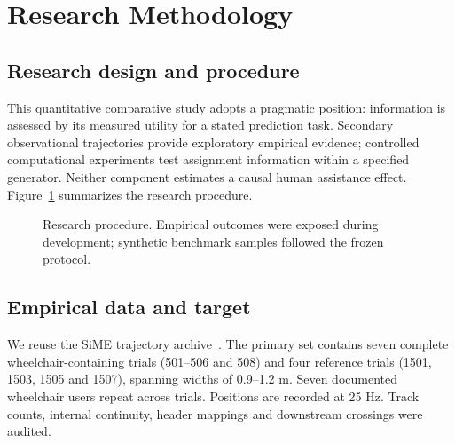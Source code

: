 \documentclass[conference]{IEEEtran}
\begin{document}
\section{Research Methodology}
\subsection{Research design and procedure}
This quantitative comparative study adopts a pragmatic position: information is assessed by its measured utility for a stated prediction task. Secondary observational trajectories provide exploratory empirical evidence; controlled computational experiments test assignment information within a specified generator. Neither component estimates a causal human assistance effect. Figure~\ref{fig:workflow} summarizes the research procedure.

\begin{figure}[t]
\centering\small
{}
\caption{Research procedure. Empirical outcomes were exposed during development; synthetic benchmark samples followed the frozen protocol.}\label{fig:workflow}
\end{figure}

\subsection{Empirical data and target}
We reuse the SiME trajectory archive~\cite{dataset}. The primary set contains seven complete wheelchair-containing trials (501--506 and 508) and four reference trials (1501, 1503, 1505 and 1507), spanning widths of 0.9--1.2 m. Seven documented wheelchair users repeat across trials. Positions are recorded at 25 Hz. Track counts, internal continuity, header mappings and downstream crossings were audited.
\end{document}

